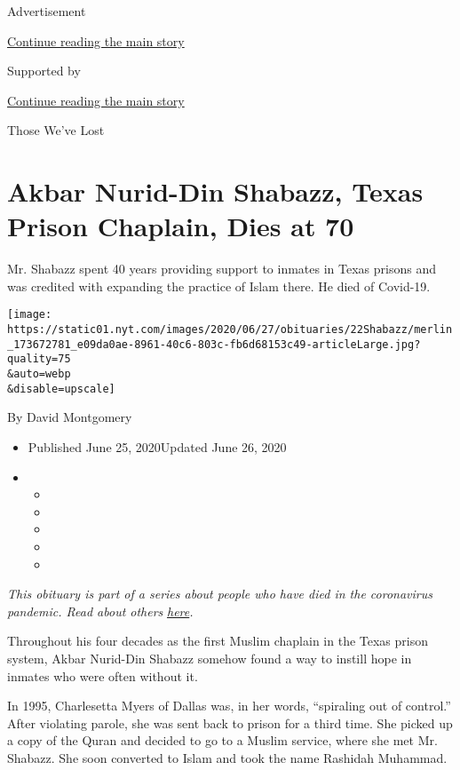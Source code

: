 Advertisement

\protect\hyperlink{after-top}{Continue reading the main story}

Supported by

\protect\hyperlink{after-sponsor}{Continue reading the main story}

Those We've Lost

\hypertarget{akbar-nurid-din-shabazz-texas-prison-chaplain-dies-at-70}{%
\section{Akbar Nurid-Din Shabazz, Texas Prison Chaplain, Dies at
70}\label{akbar-nurid-din-shabazz-texas-prison-chaplain-dies-at-70}}

Mr. Shabazz spent 40 years providing support to inmates in Texas prisons
and was credited with expanding the practice of Islam there. He died of
Covid-19.

\texttt{[image: https://static01.nyt.com/images/2020/06/27/obituaries/22Shabazz/merlin\_173672781\_e09da0ae-8961-40c6-803c-fb6d68153c49-articleLarge.jpg?quality=75\\\&auto=webp\\\&disable=upscale]}

By David Montgomery

\begin{itemize}
\item
  Published June 25, 2020Updated June 26, 2020
\item
  \begin{itemize}
  \item
  \item
  \item
  \item
  \item
  \end{itemize}
\end{itemize}

\emph{This obituary is part of a series about people who have died in
the coronavirus pandemic. Read about others}
\href{https://www.nytimes.com/interactive/2020/obituaries/people-died-coronavirus-obituaries.html}{\emph{here}}\emph{.}

Throughout his four decades as the first Muslim chaplain in the Texas
prison system, Akbar Nurid-Din Shabazz somehow found a way to instill
hope in inmates who were often without it.

In 1995, Charlesetta Myers of Dallas was, in her words, ``spiraling out
of control.'' After violating parole, she was sent back to prison for a
third time. She picked up a copy of the Quran and decided to go to a
Muslim service, where she met Mr. Shabazz. She soon converted to Islam
and took the name Rashidah Muhammad.

